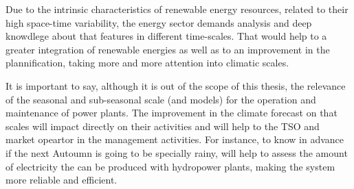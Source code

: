 Due to the intrinsic characteristics of renewable energy resources, related to their high space-time variability, the energy sector demands analysis and deep knowdlege about that features in different time-scales. That would help to a greater integration of renewable energies as well as to an improvement in the plannification, taking more and more attention into climatic scales.


It is important to say, although it is out of the scope of this thesis, the relevance of the seasonal and sub-seasonal scale (and models) for the operation and maintenance of power plants. The improvement in the climate forecast on that scales will impact directly on their activities and will help to the TSO and market opeartor in the management activities. For instance, to know in advance if the next Autoumn is going to be specially rainy, will help to assess the amount of electricity the can be produced with hydropower plants, making the system more reliable and efficient.


